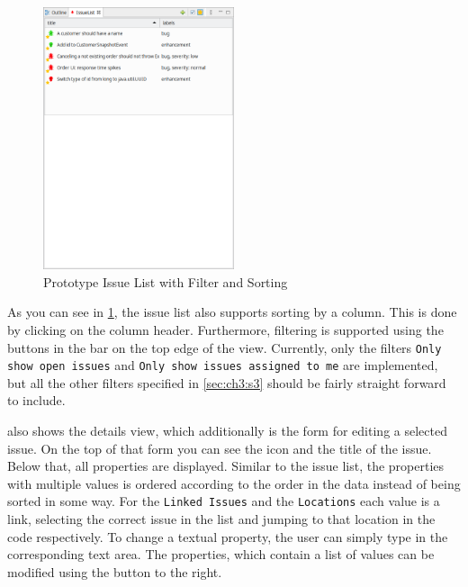 \begin{figure}[!h]
	\centering
	\includegraphics[width=0.5\textwidth]{graphics/screenshot_gropius_ei_issue_list_filtered_sorted.png}
	\caption{Prototype Issue List with Filter and Sorting}
	\label{fig:c4:screenshot_issue_list_filtered_sorted}
\end{figure}
As you can see in \cref{fig:c4:screenshot_issue_list_filtered_sorted}, the issue list also supports sorting by a column.
This is done by clicking on the column header.
Furthermore, filtering is supported using the buttons in the bar on the top edge of the view.
Currently, only the filters \lstinline|Only show open issues| and \lstinline|Only show issues assigned to me| are implemented, 
but all the other filters specified in \cref{sec:ch3:s3} should be fairly straight forward to include.

 also shows the details view, which additionally is the form for editing a selected issue.
On the top of that form you can see the icon and the title of the issue.
Below that, all properties are displayed.
Similar to the issue list, the properties with multiple values is ordered according to the order in the data instead of being sorted in some way.
For the \lstinline|Linked Issues| and the \lstinline|Locations| each value is a link, 
selecting the correct issue in the list and jumping to that location in the code respectively.
To change a textual property, the user can simply type in the corresponding text area.
The properties, which contain a list of values can be modified using the button to the right.

